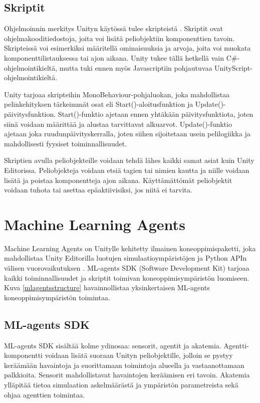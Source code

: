 \documentclass[utf8]{gradu3}
\begin{document}
\subsection{Skriptit}

Ohjelmoinnin merkitys Unityn käytössä tulee skripteistä \parencite{unitydocscripts}. Skriptit ovat ohjelmakooditiedostoja, joita voi lisätä peliobjektiin komponenttien tavoin. Skripteissä voi esimerkiksi määritellä ominaisuuksia ja arvoja, joita voi muokata komponenttilistauksessa tai ajon aikana. Unity tukee tällä hetkellä vain C\#-ohjelmointikieltä, mutta tuki ennen myös Javascriptiin pohjautuvaa UnityScript-ohjelmointikieltä.

Unity tarjoaa skripteihin MonoBehaviour-pohjaluokan, joka mahdollistaa pelinkehityksen tärkeimmät osat eli Start()-aloitusfunktion ja Update()-päivitysfunktion. Start()-funktio ajetaan ennen yhtäkään päivitysfunktiota, joten siinä voidaan määrittää ja alustaa tarvittavat alkuarvot. Update()-funktio ajetaan joka ruudunpäivityskerralla, joten siihen sijoitetaan usein pelilogiikka ja mahdollisesti fyysiset toiminnallisuudet.

Skriptien avulla peliobjekteille voidaan tehdä lähes kaikki samat asiat kuin Unity Editorissa. Peliobjekteja voidaan etsiä tagien tai nimien kautta ja niille voidaan lisätä ja poistaa komponentteja ajon aikana. Käyttämättömät peliobjektit voidaan tuhota tai asettaa epäaktiivisiksi, jos niitä ei tarvita.

\section{Machine Learning Agents}

Machine Learning Agents on Unitylle kehitetty ilmainen koneoppimispaketti, joka mahdollistaa Unity Editorilla luotujen simulaatioympäristöjen ja Python APIn välisen vuorovaikutuksen \parencite{juliani2018unity}. ML-agents SDK (Software Development Kit) tarjoaa kaikki toiminnallisuudet ja skriptit toimivan koneoppimisympäristön luomiseen. Kuva \ref{mlagentsstructure} havainnollistaa yksinkertaisen ML-agents koneoppimisympäristön toimintaa.

\subsection{ML-agents SDK}

ML-agents SDK sisältää kolme ydinosaa: sensorit, agentit ja akatemia. Agentti-komponentti voidaan lisätä suoraan Unityn peliobjektille, jolloin se pystyy keräämään havaintoja ja suorittamaan toimintoja alueella ja vastaanottamaan palkkioita. Sensorit mahdollistavat havaintojen keräämisen eri tavoin. Akatemia ylläpitää tietoa simulaation askelmäärästä ja ympäristön parametreista sekä ohjaa agenttien toimintaa.
\end{document}
